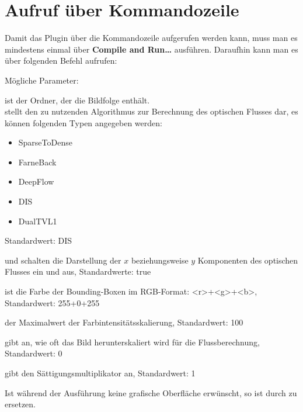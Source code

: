 \section{Aufruf über Kommandozeile}

Damit das Plugin über die Kommandozeile aufgerufen werden kann, muss man es mindestens einmal über \textbf{Compile and Run\dots} ausführen. Daraufhin kann man es über folgenden Befehl aufrufen:



Mögliche Parameter:

 ist der Ordner, der die Bildfolge enthält.
 \\

 stellt den zu nutzenden Algorithmus zur Berechnung des optischen Flusses dar, es können folgenden Typen angegeben werden:

\begin{itemize}
\item SparseToDense
\item FarneBack
\item DeepFlow
\item DIS
\item DualTVL1
\end{itemize}

Standardwert: DIS 

 und  schalten die Darstellung der $x$ beziehungsweise $y$ Komponenten des optischen Flusses ein und aus, Standardwerte: true

 ist die Farbe der Bounding-Boxen im RGB-Format: <r>+<g>+<b>, Standardwert: 255+0+255

 der Maximalwert der Farbintensitätsskalierung, Standardwert: 100

 gibt an, wie oft das Bild herunterskaliert wird für die Flussberechnung, Standardwert: 0

 gibt den Sättigungsmultiplikator an, Standardwert: 1


Ist während der Ausführung keine grafische Oberfläche erwünscht, so ist  durch  zu ersetzen.